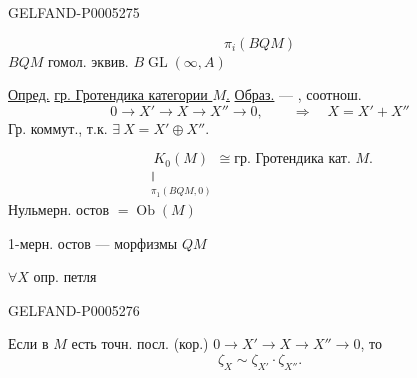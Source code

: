\begin{GelfandAdjacentEvidence}{GELFAND-P000527}{5}

\[
\pi_i(BQM)
\]
$BQM$ гомол. эквив. $B\operatorname{GL}(\infty,A)$

\uline{Опред.} \uline{гр. Гротендика категории \mbox{$M$}.}
\uline{Образ.} — , соотнош.
\[
0\to X'\to X\to X''\to0,\qquad\Rightarrow\quad X=X'+X''
\]
Гр. коммут., т.к. $\exists\ X=X'\oplus X''$.

\[
\underset{\substack{\Vert\\\pi_1(BQM,0)}}{K_0(M)}\cong
\text{гр. Гротендика кат. }M.
\]
Нульмерн. остов $=\operatorname{Ob}(M)$

1-мерн. остов — морфизмы $QM$

$\forall X$ опр. петля
\end{GelfandAdjacentEvidence}
\begin{GelfandAdjacentEvidence}{GELFAND-P000527}{6}


Если в $M$ есть точн. посл. (кор.) $0\to X'\to X\to X''\to0$,
то
\[
\zeta_X\sim\zeta_{X'}\cdot\zeta_{X''}.
\]
\end{GelfandAdjacentEvidence}
